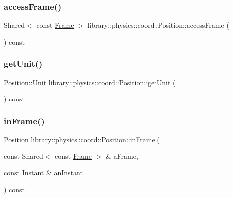 \mbox{\label{classlibrary_1_1physics_1_1coord_1_1_position_a26c1f0eba51a3441106367eac1827455}} 
\subsubsection{\texorpdfstring{access\+Frame()}{accessFrame()}}
{\footnotesize\ttfamily Shared$<$ const \hyperlink{classlibrary_1_1physics_1_1coord_1_1_frame}{Frame} $>$ library\+::physics\+::coord\+::\+Position\+::access\+Frame (\begin{DoxyParamCaption}{ }\end{DoxyParamCaption}) const}

\mbox{\label{classlibrary_1_1physics_1_1coord_1_1_position_a1b6173fd9226069e36ac075b444be794}} 
\subsubsection{\texorpdfstring{get\+Unit()}{getUnit()}}
{\footnotesize\ttfamily \hyperlink{classlibrary_1_1physics_1_1units_1_1_length_a3b8b39cd245cf6b19dc34459baeccb18}{Position\+::\+Unit} library\+::physics\+::coord\+::\+Position\+::get\+Unit (\begin{DoxyParamCaption}{ }\end{DoxyParamCaption}) const}

\mbox{\label{classlibrary_1_1physics_1_1coord_1_1_position_af8dcfe9e1f9e172d2123ab38cd7b30c8}} 
\subsubsection{\texorpdfstring{in\+Frame()}{inFrame()}}
{\footnotesize\ttfamily \hyperlink{classlibrary_1_1physics_1_1coord_1_1_position}{Position} library\+::physics\+::coord\+::\+Position\+::in\+Frame (\begin{DoxyParamCaption}\item[{const Shared$<$ const \hyperlink{classlibrary_1_1physics_1_1coord_1_1_frame}{Frame} $>$ \&}]{a\+Frame,  }\item[{const \hyperlink{classlibrary_1_1physics_1_1time_1_1_instant}{Instant} \&}]{an\+Instant }\end{DoxyParamCaption}) const}

